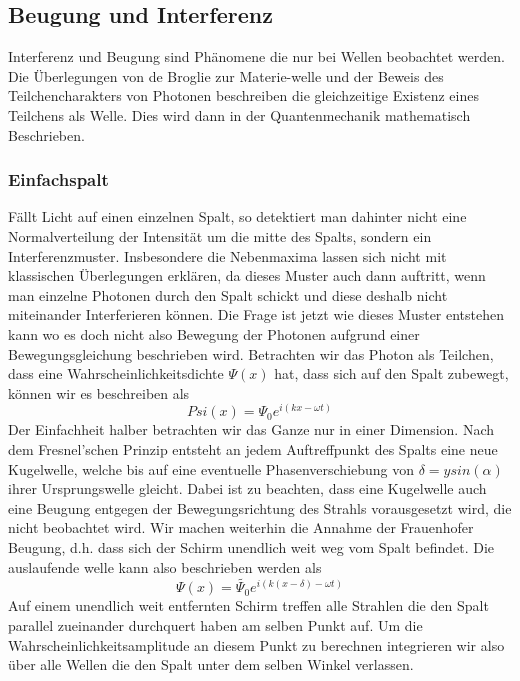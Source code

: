 \documentclass[]{article}
\begin{document}
\subsection{Beugung und Interferenz} %
Interferenz und Beugung sind Phänomene die nur bei Wellen beobachtet werden. Die Überlegungen von de Broglie zur Materie-welle und der Beweis des Teilchencharakters von Photonen beschreiben die gleichzeitige Existenz eines Teilchens als Welle. Dies wird dann in der Quantenmechanik mathematisch Beschrieben. 
\subsubsection{Einfachspalt}
Fällt Licht auf einen einzelnen Spalt, so detektiert man dahinter nicht eine Normalverteilung der Intensität um die mitte des Spalts, sondern ein Interferenzmuster. Insbesondere die Nebenmaxima lassen sich nicht mit klassischen Überlegungen erklären, da dieses Muster auch dann auftritt, wenn man einzelne Photonen durch den Spalt schickt und diese deshalb nicht miteinander Interferieren können.%
Die Frage ist jetzt wie dieses Muster entstehen kann wo es doch nicht also Bewegung der Photonen aufgrund einer Bewegungsgleichung beschrieben wird. Betrachten wir das Photon als Teilchen, dass eine Wahrscheinlichkeitsdichte $\Psi(x)$ hat, dass sich auf den Spalt zubewegt, können wir es beschreiben als 
\begin{equation}
	Psi(x)=\Psi_{0}e^{i(kx-\omega t)}
\end{equation}
Der Einfachheit halber betrachten wir das Ganze nur in einer Dimension. Nach dem Fresnel'schen Prinzip entsteht an jedem Auftreffpunkt des Spalts eine neue Kugelwelle, welche bis auf eine eventuelle Phasenverschiebung von $\delta =y sin(\alpha) $ ihrer Ursprungswelle gleicht. Dabei ist zu beachten, dass eine Kugelwelle auch eine Beugung entgegen der Bewegungsrichtung des Strahls vorausgesetzt wird, die nicht beobachtet wird. Wir machen weiterhin die Annahme der Frauenhofer Beugung, d.h. dass sich der Schirm unendlich weit weg vom Spalt befindet. Die auslaufende welle kann also beschrieben werden als
\begin{equation}
	\Psi(x)=\tilde{\Psi_{0}}e^{i(k(x-\delta)-\omega t)}
\end{equation}
Auf einem unendlich weit entfernten Schirm treffen alle Strahlen die den Spalt parallel zueinander durchquert haben am selben Punkt auf. Um die Wahrscheinlichkeitsamplitude an diesem Punkt zu berechnen integrieren wir also über alle Wellen die den Spalt unter dem selben Winkel verlassen.
\end{document}
